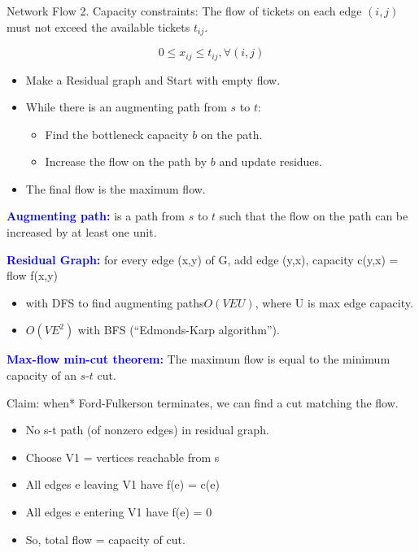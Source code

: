 \documentclass[10pt,a4paper]{article}
\begin{document}
\begin{multicols}{3}
\begin{textbox}{Network Flow}
        2. Capacity constraints: The flow of tickets on each edge $(i, j)$ must not exceed the available tickets $t_{ij}$.

        \begin{equation}
            0 \le x_{ij} \le t_{ij}, \forall (i, j)
        \end{equation}
        \begin{itemize}
            \item Make a Residual graph and Start with empty flow.
            \item While there is an augmenting path from $s$ to $t$:
                  \begin{itemize}
                      \item Find the bottleneck capacity $b$ on the path.
                      \item Increase the flow on the path by $b$ and update residues.
                  \end{itemize}
            \item The final flow is the maximum flow.
        \end{itemize}
        \textcolor{blue}{{\bf Augmenting path:}} is a path from $s$ to $t$ such that the flow on the path can be increased by at least one unit.

        \textcolor{blue}{{\bf Residual Graph:}}  for every edge (x,y) of G, add edge (y,x), capacity c(y,x) = flow f(x,y)

        \begin{itemize}
            \item with DFS to find augmenting paths$O(VEU)$, where U is max edge capacity.
            \item $O(VE^2)$ with BFS (“Edmonds-Karp algorithm”).
        \end{itemize}

        \textcolor{blue}{{\bf Max-flow min-cut theorem:}} The maximum flow is equal to the minimum capacity of an $s$-$t$ cut.

        \smallskip
        Claim: when* Ford-Fulkerson terminates, we can find a cut matching the flow.
        \begin{itemize}
            \item No s-t path (of nonzero edges) in residual graph.
            \item Choose V1 = {vertices reachable from s}
            \item All edges e leaving V1 have f(e) = c(e)
            \item All edges e entering V1 have f(e) = 0
            \item So, total flow = capacity of cut.
        \end{itemize}

    \end{textbox}

\end{multicols}
\end{document}
